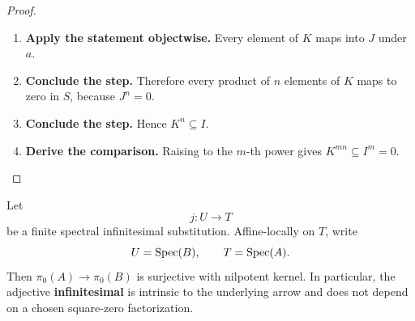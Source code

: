 \begin{proof}
\leavevmode
\begin{enumerate}[label=\textup{(\arabic*)}]
    \item \textbf{Apply the statement objectwise.}
    Every element of \(K\) maps into \(J\) under \(a\).

    \item \textbf{Conclude the step.}
    Therefore every product of \(n\) elements of \(K\) maps to zero in \(S\),
    because \(J^n=0\).

    \item \textbf{Conclude the step.}
    Hence \(K^n\subseteq I\).

    \item \textbf{Derive the comparison.}
    Raising to the \(m\)-th power gives \(K^{mn}\subseteq I^m=0\).
\end{enumerate}
\end{proof}

\begin{proposition}
\label{prop:finite-infinitesimal-pi0-nilpotent}
Let
\[
    j:U\longrightarrow T
\]
be a finite spectral infinitesimal substitution. Affine-locally on \(T\),
write
\[
    U=\operatorname{Spec}(B),\qquad T=\operatorname{Spec}(A).
\]
Then \(\pi_0(A)\to\pi_0(B)\) is surjective with nilpotent kernel. In
particular, the adjective \textbf{infinitesimal} is intrinsic to the underlying
arrow and does not depend on a chosen square-zero factorization.
\end{proposition}

